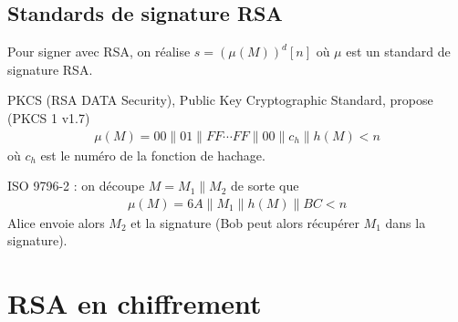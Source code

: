         \subsection{Standards de signature RSA}
            Pour signer avec RSA, on réalise $s = (\mu(M))^d [n]$ où $\mu$ est un standard de signature RSA. 
            \begin{expl}
                PKCS (RSA DATA Security), Public Key Cryptographic Standard, propose (PKCS 1 v1.7) 
                \begin{align*}
                    \mu(M) = 00 \| 01 \| FF \cdots FF \| 00 \| c_h \| h(M) < n
                \end{align*}
                où $c_h$ est le numéro de la fonction de hachage.
            \end{expl}
            \begin{expl}
                ISO 9796-2 : on découpe $M = M_1 \| M_2$ de sorte que  
                \begin{align*}
                    \mu(M) = 6A \| M_1 \| h(M) \| BC < n
                \end{align*}
                Alice envoie alors $M_2$ et la signature (Bob peut alors récupérer $M_1$ dans la signature).
            \end{expl}
            
    \section{RSA en chiffrement}
